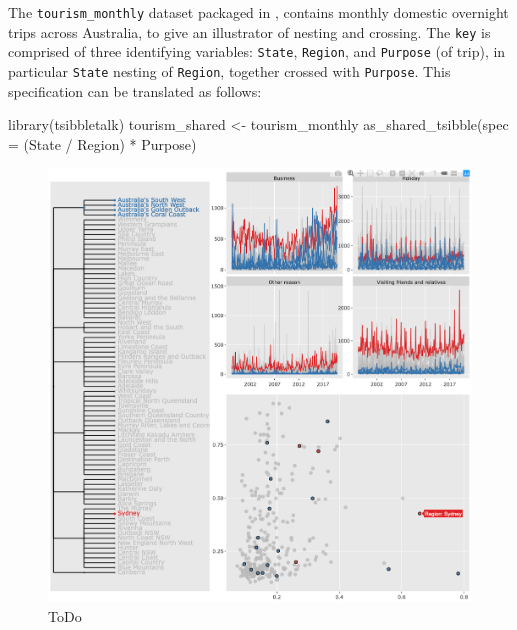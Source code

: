 The \texttt{tourism\_monthly} dataset packaged in ,
contains monthly domestic overnight trips across Australia, to give an
illustrator of nesting and crossing. The \texttt{key} is comprised of
three identifying variables: \texttt{State}, \texttt{Region}, and
\texttt{Purpose} (of trip), in particular \texttt{State} nesting of
\texttt{Region}, together crossed with \texttt{Purpose}. This
specification can be translated as follows:

\begin{Schunk}
\begin{Sinput}
library(tsibbletalk)
tourism_shared <- tourism_monthly %
  as_shared_tsibble(spec = (State / Region) * Purpose)
\end{Sinput}
\end{Schunk}

\begin{Schunk}
\begin{figure}

{\centering \includegraphics[width=\textwidth]{img/tourism-linking} 

}

\caption[ToDo]{ToDo}\label{fig:tourism-linking-fig}
\end{figure}
\end{Schunk}

